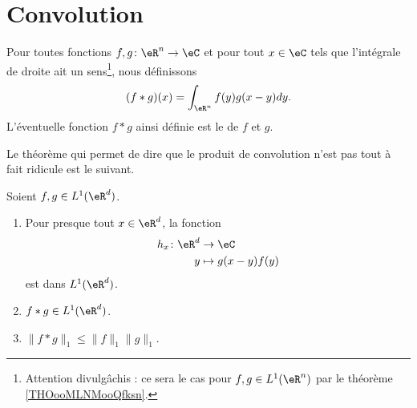 \section{Convolution}


\begin{definition}      \label{DEFooHHCMooHzfStu}
	Pour toutes fonctions \( f,g\colon \eR^n\to \eC\) et pour tout \( x\in \eC\) tels que l'intégrale de droite ait un sens\footnote{Attention divulgâchis : ce sera le cas pour \( f,g\in L^1(\eR^n)\) par le théorème \ref{THOooMLNMooQfksn}.}, nous définissons
	\begin{equation}
		(f*g)(x)=\int_{\eR^n} f(y)g(x-y)dy.
	\end{equation}
	L'éventuelle fonction \( f*g\) ainsi définie est le  de \( f\) et \( g\).
\end{definition}

Le théorème qui permet de dire que le produit de convolution n'est pas tout à fait ridicule est le suivant.

\begin{theorem}     \label{THOooMLNMooQfksn}
	Soient \( f,g\in L^1(\eR^d)\).
	\begin{enumerate}
		\item
		      Pour presque tout \( x\in \eR^d\), la fonction
		      \begin{equation}
			      \begin{aligned}
				      h_x\colon \eR^d & \to \eC            \\
				      y               & \mapsto g(x-y)f(y)
			      \end{aligned}
		      \end{equation}
		      est dans \( L^1(\eR^d)\).
		\item
		      \( f*g\in L^1(\eR^d)\).
		\item
		      \( \| f*g \|_1\leq \| f \|_1\| g \|_1\).
	\end{enumerate}
\end{theorem}

